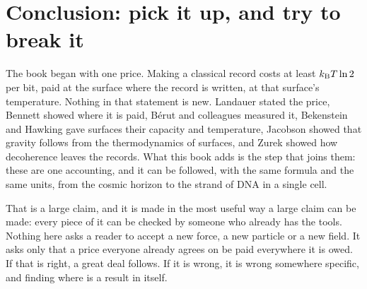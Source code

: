 \chapter{Conclusion: pick it up, and try to break it}\label{ch:conclusion}

The book began with one price. Making a classical record costs at least $k_{\mathrm B} T\ln2$ per bit, paid at the surface where the record is written,
at that surface's temperature. Nothing in that statement is new. Landauer stated the price, Bennett showed where it is paid, B\'erut and
colleagues measured it, Bekenstein and Hawking gave surfaces their capacity and temperature, Jacobson showed that gravity follows from the
thermodynamics of surfaces, and Zurek showed how decoherence leaves the records. What this book adds is the step that joins them: these are one
accounting, and it can be followed, with the same formula and the same units, from the cosmic horizon to the strand of DNA in a single cell.

That is a large claim, and it is made in the most useful way a large claim can be made: every piece of it can be checked by someone who already
has the tools. Nothing here asks a reader to accept a new force, a new particle or a new field. It asks only that a price everyone already
agrees on be paid everywhere it is owed. If that is right, a great deal follows. If it is wrong, it is wrong somewhere specific, and finding where
is a result in itself.

